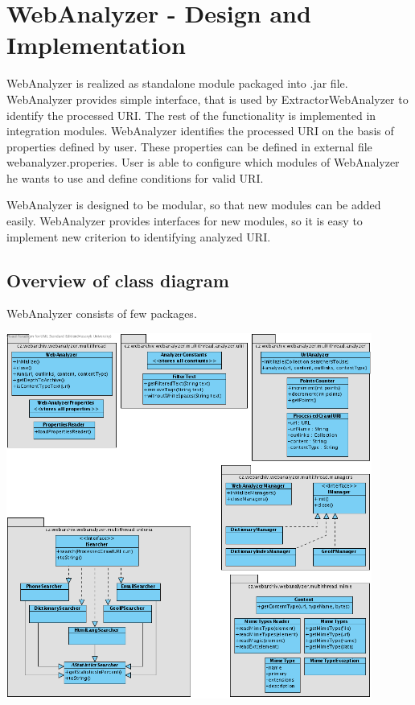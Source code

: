 \documentclass[11pt,a4paper]{article}
\begin{document}

\newpage
\section{WebAnalyzer - Design and Implementation}

WebAnalyzer is realized as standalone module packaged into .jar file. WebAnalyzer provides simple interface, that is used by ExtractorWebAnalyzer to identify the processed URI. The rest of the functionality is implemented in integration modules. WebAnalyzer identifies the processed URI on the basis of properties defined by user. These properties can be defined in external file webanalyzer.properies. User is able to configure which modules of WebAnalyzer he wants to use and define conditions for valid URI.

WebAnalyzer is designed to be modular, so that new modules can be added easily. WebAnalyzer provides interfaces for new modules, so it is easy to implement new criterion to identifying analyzed URI.

\subsection{Overview of class diagram}

WebAnalyzer consists of few packages.

\includegraphics[width=120mm]{webanalyzerCD.png}
\end{document}
